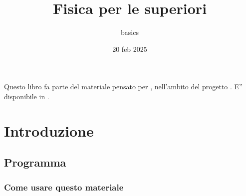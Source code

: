 \documentclass[letterpaper,10pt,italian]{jupyterBook}
\title{Fisica per le superiori}
\date{20 feb 2025}
\author{basics}
\begin{document}
\pagestyle{empty}
\sphinxmaketitle
\pagestyle{plain}
\sphinxtableofcontents
\pagestyle{normal}
\label{\detokenize{intro::doc}}


\sphinxAtStartPar
Questo libro fa parte del materiale pensato per , nell’ambito del progetto . E” disponibile in .





\sphinxstepscope


\part{Introduzione}

\sphinxstepscope


\chapter{Programma}
\label{\detokenize{ch/program:programma}}\label{\detokenize{ch/program:physics-hs-program}}\label{\detokenize{ch/program::doc}}

\section{Come usare questo materiale}
\label{\detokenize{ch/program:come-usare-questo-materiale}}
\end{document}
